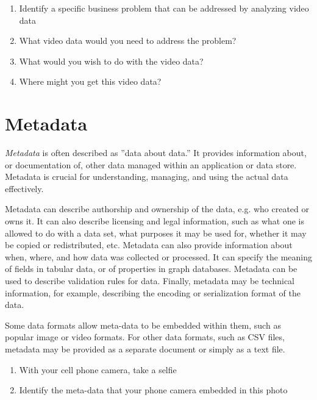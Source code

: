 \begin{exerciseboxpaper}
\begin{enumerate}
	\item Identify a specific business problem that can be addressed by analyzing video data
	\item What video data would you need to address the problem?
	\item What would you wish to do with the video data?
	\item Where might you get this video data?
\end{enumerate}
\end{exerciseboxpaper}

\section{Metadata}

\emph{Metadata} is often described as ''data about data.'' It provides information about, or documentation of, other data managed within an application or data store. Metadata is crucial for understanding, managing, and using the actual data effectively.

Metadata can describe authorship and ownership of the data, e.g. who created or owns it. It can also describe licensing and legal information, such as what one is allowed to do with a data set, what purposes it may be used for, whether it may be copied or redistributed, etc. Metadata can also provide information about when, where, and how data was collected or processed. It can specify the meaning of fields in tabular data, or of properties in graph databases. Metadata can be used to describe validation rules for data. Finally, metadata may be technical information, for example, describing the encoding or serialization format of the data. 

Some data formats allow meta-data to be embedded within them, such as popular image or video formats. For other data formats, such as CSV files, metadata may be provided as a separate document or simply as a text file.

\begin{exerciseboxcomputer}
\begin{enumerate}
	\item With your cell phone camera, take a selfie
	\item Identify the meta-data that your phone camera embedded in this photo
\end{enumerate}
\end{exerciseboxcomputer}

